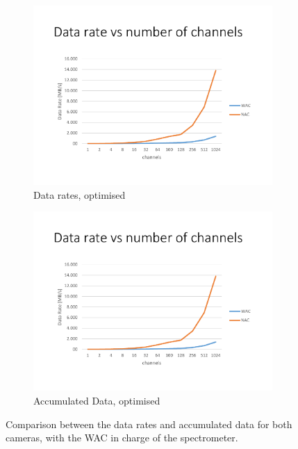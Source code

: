 \begin{figure}[h!]
    \centering
    \begin{subfigure}[b]{0.48\textwidth}
        \includegraphics[width=\textwidth,page=8,trim=15mm 15mm 15mm 32mm,clip]{figures/Orbiter/Graphs_excel.pdf}
        \caption{Data rates, optimised}\label{fig:data_rate_compare_final}
    \end{subfigure}
    \begin{subfigure}[b]{0.48\textwidth}
        \includegraphics[width=\textwidth,page=9,trim=15mm 15mm 15mm 32mm,clip]{figures/Orbiter/Graphs_excel.pdf}
        \caption{Accumulated Data, optimised}\label{fig:data_acc_spec_compare_final}
    \end{subfigure}
    \caption{Comparison between the data rates and accumulated data for both cameras, with the WAC in charge of the spectrometer.}\label{fig:data_gen_wac_nac_compare_final}
\end{figure}
